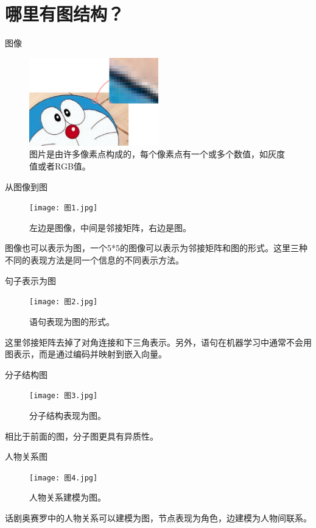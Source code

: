 \documentclass{beamer}
\begin{document}
\section{哪里有图结构？}

\begin{frame}{图像}
    \begin{figure}
        \includegraphics[width=0.5\textwidth]{图片像素.jpg}
        \caption{图片是由许多像素点构成的，每个像素点有一个或多个数值，如灰度值或者RGB值。}
    \end{figure}
\end{frame}

\begin{frame}{从图像到图}
    \begin{figure}
        \texttt{[image: 图1.jpg]}
        \caption{左边是图像，中间是邻接矩阵，右边是图。}
    \end{figure}
    图像也可以表示为图，一个5*5的图像可以表示为邻接矩阵和图的形式。这里三种不同的表现方法是同一个信息的不同表示方法。
\end{frame}

\begin{frame}{句子表示为图}
    \begin{figure}
        \texttt{[image: 图2.jpg]}
        \caption{语句表现为图的形式。}
    \end{figure}
    这里邻接矩阵去掉了对角连接和下三角表示。另外，语句在机器学习中通常不会用图表示，而是通过编码并映射到嵌入向量。
\end{frame}

\begin{frame}{分子结构图}
    \begin{figure}
        \texttt{[image: 图3.jpg]}
        \caption{分子结构表现为图。}
    \end{figure}
    相比于前面的图，分子图更具有异质性。
\end{frame}

\begin{frame}{人物关系图}
    \begin{figure}
        \texttt{[image: 图4.jpg]}
        \caption{人物关系建模为图。}
    \end{figure}
    话剧奥赛罗中的人物关系可以建模为图，节点表现为角色，边建模为人物间联系。
\end{frame}
\end{document}
